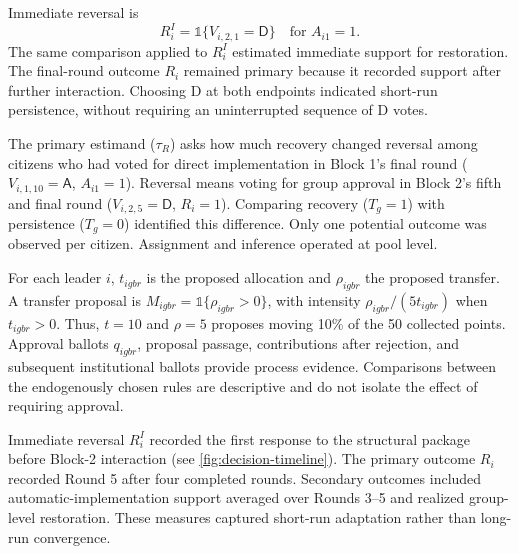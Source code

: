 \documentclass[11pt]{article}
\newcommand{\Dproc}{\textsf{D}}
\newcommand{\Aproc}{\textsf{A}}
\newcommand{\ind}[1]{\mathbb{1}\{#1\}}
\begin{document}
Immediate reversal is
\begin{equation}
R_i^{I}=\ind{V_{i,2,1}=\Dproc}\quad\text{for }A_{i1}=1.
\end{equation}
The same comparison applied to \(R_i^{I}\) estimated immediate support for restoration. The final-round outcome \(R_i\) remained primary because it recorded support after further interaction. Choosing \Dproc{} at both endpoints indicated short-run persistence, without requiring an uninterrupted sequence of \Dproc{} votes.

\begin{plainlanguagebox}
The primary estimand ($\tau_R$) asks how much recovery changed reversal among citizens who had voted for direct implementation in Block 1's final round ($V_{i,1,10}=\Aproc$, $A_{i1}=1$). Reversal means voting for group approval in Block 2's fifth and final round ($V_{i,2,5}=\Dproc$, $R_i=1$). Comparing recovery ($T_g=1$) with persistence ($T_g=0$) identified this difference. Only one potential outcome was observed per citizen. Assignment and inference operated at pool level.
\end{plainlanguagebox}

For each leader $i$, $t_{igbr}$ is the proposed allocation and $\rho_{igbr}$ the proposed transfer. A transfer proposal is $M_{igbr}=\ind{\rho_{igbr}>0}$, with intensity $\rho_{igbr}/(5t_{igbr})$ when $t_{igbr}>0$. Thus, $t=10$ and $\rho=5$ proposes moving 10\% of the 50 collected points. Approval ballots $q_{igbr}$, proposal passage, contributions after rejection, and subsequent institutional ballots provide process evidence. Comparisons between the endogenously chosen rules are descriptive and do not isolate the effect of requiring approval.

Immediate reversal \(R_i^{I}\) recorded the first response to the structural package before Block-2 interaction (see \autoref{fig:decision-timeline}). The primary outcome \(R_i\) recorded Round 5 after four completed rounds. Secondary outcomes included automatic-implementation support averaged over Rounds 3--5 and realized group-level restoration. These measures captured short-run adaptation rather than long-run convergence.
\end{document}
